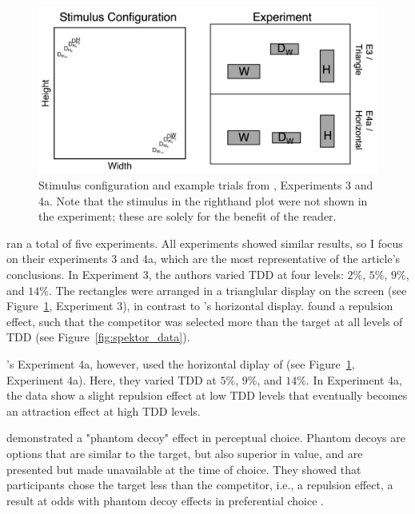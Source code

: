 \begin{figure}
   \includegraphics[width=\linewidth]{figures/spektor_stim.png}
   \caption{Stimulus configuration and example trials from \textcite{spektorWhenGoodLooks2018b}, Experiments 3 and 4a. Note that the stimulus in the righthand plot were not shown in the experiment; these are solely for the benefit of the reader.}
   \label{fig:spektor_stim}
\end{figure}

\textcite{spektorWhenGoodLooks2018b} ran a total of five experiments. All experiments showed similar results, so I focus on their experiments 3 and 4a, which are the most representative of the article's conclusions. In Experiment 3, the authors varied TDD at four levels: $2\%$, $5\%$, $9\%$, and $14\%$. The rectangles were arranged in a trianglular display on the screen (see Figure~\ref{fig:spektor_stim}, Experiment 3), in contrast to \textcite{trueblood2013not}'s horizontal display. \textcite{spektorWhenGoodLooks2018b} found a repulsion effect, such that the competitor was selected more than the target at all levels of TDD (see Figure~\ref{fig:spektor_data}). 

\textcite{spektorWhenGoodLooks2018b}'s Experiment 4a, however, used the horizontal diplay of \textcite{trueblood2013not} (see Figure~\ref{fig:spektor_stim}, Experiment 4a). Here, they varied TDD at $5\%$, $9\%$, and $14\%$. In Experiment 4a, the data show a slight repulsion effect at low TDD levels that eventually becomes an attraction effect at high TDD levels. 

\textcite{truebloodPhantomDecoyEffect2017c} demonstrated a "phantom decoy" effect in perceptual choice. Phantom decoys are options that are similar to the target, but also superior in value, and are presented but made unavailable at the time of choice. They showed that participants chose the target less than the competitor, i.e., a repulsion effect, a result at odds with phantom decoy effects in preferential choice \parencite{pratkanisBriefHistoryResearch1992b,pettiboneExaminingModelsNondominated2000}. 

